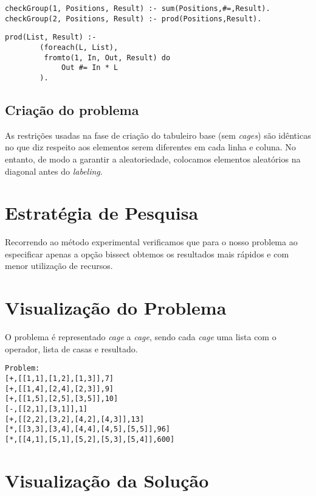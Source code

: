 \documentclass[runningheads,a4paper]{llncs}
\begin{document}
\begin{lstlisting}
checkGroup(1, Positions, Result) :- sum(Positions,#=,Result).
checkGroup(2, Positions, Result) :- prod(Positions,Result).
\end{lstlisting}

\begin{lstlisting}
prod(List, Result) :-
        (foreach(L, List),
         fromto(1, In, Out, Result) do
             Out #= In * L
        ).
\end{lstlisting}

\subsection{Criação do problema}

As restrições usadas na fase de criação do tabuleiro base (sem \textit{cages}) são idênticas no que diz respeito aos elementos serem diferentes em cada linha e coluna. No entanto, de modo a garantir a aleatoriedade, colocamos elementos aleatórios na diagonal antes do \textit{labeling}.


\section{Estratégia de Pesquisa}

Recorrendo ao método experimental verificamos que para o nosso problema ao especificar apenas a opção bissect  obtemos os resultados mais rápidos e com menor utilização de recursos.

\section{Visualização do Problema}

O problema é representado \textit{cage} a \textit{cage}, sendo cada \textit{cage} uma lista com o operador, lista de casas e resultado.

\begin{lstlisting}
Problem:
[+,[[1,1],[1,2],[1,3]],7]
[+,[[1,4],[2,4],[2,3]],9]
[+,[[1,5],[2,5],[3,5]],10]
[-,[[2,1],[3,1]],1]
[+,[[2,2],[3,2],[4,2],[4,3]],13]
[*,[[3,3],[3,4],[4,4],[4,5],[5,5]],96]
[*,[[4,1],[5,1],[5,2],[5,3],[5,4]],600]
\end{lstlisting}

\section{Visualização da Solução}
\end{document}
